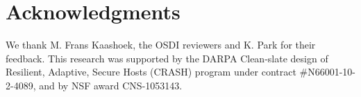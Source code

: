 \section*{Acknowledgments}

We thank M. Frans Kaashoek, the OSDI reviewers and K. Park for their feedback.
This research was supported by the DARPA Clean-slate design of Resilient,
Adaptive, Secure Hosts (CRASH) program under contract \#N66001-10-2-4089,
and by NSF award CNS-1053143.

